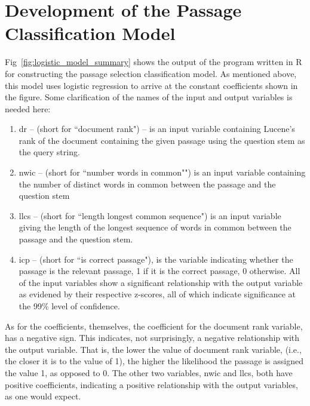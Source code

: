 

\section{Development of the Passage Classification Model}

Fig~\ref{fig:logistic_model_summary} shows the output of the program written in R \cite{james_2013_introduction_ch4} for constructing the passage selection classification model.  As mentioned above, this model uses logistic regression to arrive at the constant coefficients shown in the figure.  Some clarification of the names of the input and output variables is needed here:  

\begin{enumerate}
\item dr -- (short for ``document rank") -- is an input variable containing Lucene's rank of the document containing the given passage using the question stem as the query string.
\item nwic -- (short for ``number words in common"") is an input variable containing the number of distinct words in common between the passage and the question stem
\item llcs -- (short for ``length longest common sequence") is an input variable giving the length of the longest sequence of words in common between the passage and the question stem.  
\item icp -- (short for ``is correct passage"), is the variable indicating whether the passage is the relevant passage, 1 if it is the correct passage, 0 otherwise.  All of the input variables show a significant relationship with the output variable as evidened by their respective z-scores, all of which indicate significance at the 99\% level of confidence.
\end{enumerate}

As for the coefficients, themselves, the coefficient for the document rank variable, has a negative sign.  This indicates, not surprisingly, a negative relationship with the output variable.  That is, the lower the value of document rank variable, (i.e., the closer it is to the value of 1), the higher the likelihood the passage is assigned the value 1, as opposed to 0.  The other two variables, nwic and llcs, both have positive coefficients, indicating a positive relationship with the output variables, as one would expect.

